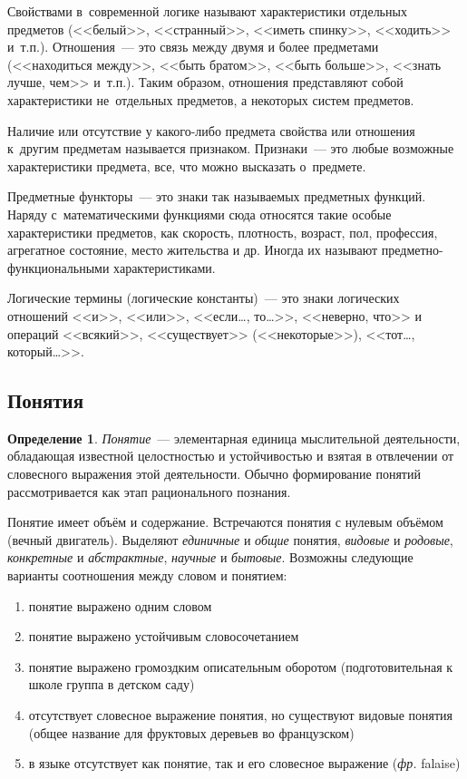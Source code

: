 \documentclass[12pt]{article}
\theoremstyle{definition}
\newtheorem*{defn}{Определение}
\theoremstyle{remark}
\numberwithin{equation}{section}
\begin{document}
Свойствами в~современной логике называют характеристики отдельных предметов 
(<<белый>>, <<странный>>, <<иметь спинку>>, <<ходить>> и~т.п.). 
Отношения~--- это связь между двумя и более предметами (<<находиться 
между>>, <<быть братом>>, <<быть больше>>, <<знать лучше, чем>> и~т.п.). 
Таким образом, отношения представляют собой характеристики не~отдельных 
предметов, а некоторых систем предметов.

Наличие или отсутствие у какого-либо предмета свойства или отношения 
к~другим предметам называется признаком. Признаки~--- это любые возможные 
характеристики предмета, все, что можно высказать о~предмете.

Предметные функторы~--- это знаки так называемых предметных функций. 
Наряду с~математическими функциями сюда относятся такие особые 
характеристики предметов, как скорость, плотность, возраст, пол, 
профессия, агрегатное состояние, место жительства и др. 
Иногда их называют предметно-функциональными характеристиками.

Логические термины (логические константы)~--- это знаки логических 
отношений <<и>>, <<или>>, <<если\dots, то\dots>>, <<неверно, что>> 
и операций <<всякий>>, <<существует>> (<<некоторые>>), <<тот…, который…>>.

\subsection{Понятия}
\label{subsec:Concept}
\begin{defn}
	\textsl{Понятие}~--- элементарная единица мыслительной деятельности, обладающая известной целостностью и устойчивостью и взятая в отвлечении от словесного выражения этой деятельности. Обычно формирование понятий рассмотривается как этап рационального познания.
\end{defn}
Понятие имеет объём и содержание. Встречаются понятия с нулевым объёмом (вечный двигатель). Выделяют \textit{единичные} и \textit{общие} понятия, \textit{видовые} и \textit{родовые}, \textit{конкретные} и \textit{абстрактные}, \textit{научные} и \textit{бытовые}. Возможны следующие варианты соотношения между словом и понятием:
\begin{enumerate}
\item понятие выражено одним словом
\item понятие выражено устойчивым словосочетанием
\item понятие выражено громоздким описательным оборотом (подготовительная к школе группа в детском саду)
\item отсутствует словесное выражение понятия, но существуют видовые понятия (общее название для фруктовых деревьев во французском)
\item в языке отсутствует как понятие, так и его словесное выражение (\textit{фр.} falaise)
\end{enumerate}
\end{document}
